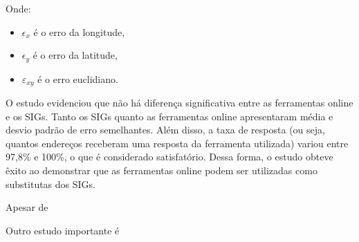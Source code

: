 Onde:
\begin{itemize}
   \item $\epsilon_x$ é o erro da longitude,
   \item $\epsilon_y$ é o erro da latitude,
   \item $\varepsilon_{xy}$ é o erro euclidiano.
\end{itemize}
   
O estudo evidenciou que não há diferença significativa entre as ferramentas online e os SIGs. Tanto os SIGs quanto as ferramentas online apresentaram média e desvio padrão de erro semelhantes. Além disso, a taxa de resposta (ou seja, quantos endereços receberam uma resposta da ferramenta utilizada) variou entre 97,8\% e 100\%, o que é considerado satisfatório. Dessa forma, o estudo obteve êxito ao demonstrar que as ferramentas online podem ser utilizadas como substitutas dos SIGs.

Apesar de %

Outro estudo importante é %

